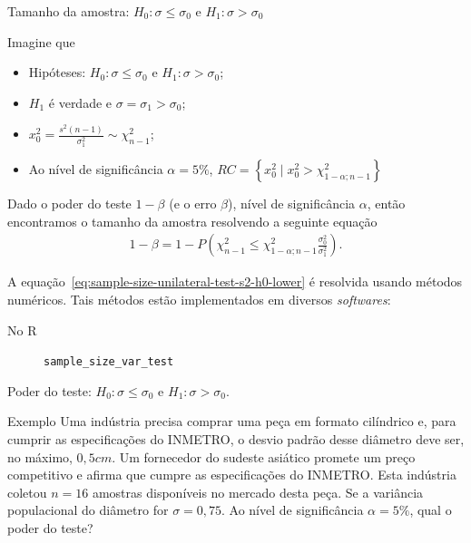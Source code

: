\documentclass[8pt]{beamer}
\begin{document}
\begin{frame}{Tamanho da amostra: $H_0: \sigma \leq \sigma_0$ e $H_1: \sigma > \sigma_0$}

Imagine que
\begin{itemize}
\item Hipóteses: $H_0: \sigma \leq \sigma_0$ e $H_1: \sigma > \sigma_0$;
\item $H_1$ é verdade e $\sigma = \sigma_1 > \sigma_0$;
\item $x_0^2 = \frac{s^2(n-1)}{\sigma_1^2} \sim \chi_{n-1}^2$;
\item Ao nível de significância $\alpha=5\%$, $RC=\left\{ x_0^2 \mid x_0^2 > \chi_{1-\alpha; n-1}^2 \right\}$
\end{itemize}
\vfill

Dado o poder do teste $1-\beta$ (e o erro $\beta$), nível de significância $\alpha$, então encontramos o tamanho da amostra resolvendo a seguinte equação
\begin{align} \label{eq:sample-size-unilateral-test-s2-h0-lower}
1-\beta =1- P \left( \chi_{n-1}^2 \leq \chi_{1-\alpha; n-1}^2 \frac{\sigma_0^2}{\sigma_1^2} \right).
\end{align}

A equação~\eqref{eq:sample-size-unilateral-test-s2-h0-lower} é resolvida usando métodos numéricos. Tais métodos estão implementados em diversos \textit{softwares}:
\begin{description}
\item[No R] \texttt{sample\_size\_var\_test}
\end{description}
\end{frame}

\begin{frame}{Poder do teste: $H_0: \sigma \leq \sigma_0$ e $H_1: \sigma > \sigma_0$.}

\large

\begin{block}{Exemplo}
	Uma indústria precisa comprar uma peça em formato cilíndrico e, para cumprir as especificações do INMETRO, o desvio padrão desse diâmetro deve ser, no máximo, $0,5cm$. Um fornecedor do sudeste asiático promete um preço competitivo e afirma que cumpre as especificações do INMETRO. Esta indústria coletou $n=16$ amostras disponíveis no mercado desta peça. Se a variância populacional do diâmetro for $\sigma=0,75$. Ao nível de significância $\alpha=5\%$, qual o poder do teste?
\end{block}
\normalsize

\end{frame}
\end{document}
